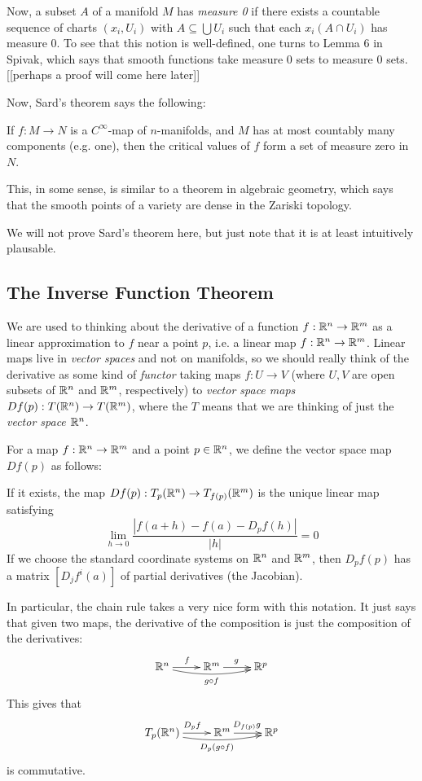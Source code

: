 \documentclass[11pt, english]{article}
\begin{document}
Now, a subset $A$  of a manifold $M$ has \emph{measure 0} if there exists a countable sequence of charts $(x_i, U_i)$  with $A \subseteq \bigcup U_i$ such that each $x_i(A \cap U_i)$ has measure $0$. To see that this notion is well-defined, one turns to Lemma 6 in Spivak, which says that smooth functions take measure 0 sets to measure 0 sets. [[perhaps a proof will come here later]]

Now, Sard's theorem says the following:
\begin{thm}
If $f:M \to N$ is a $C^\infty$-map of $n$-manifolds, and $M$ has at most countably many components (e.g. one), then the critical values of $f$ form a set of measure zero in $N$.
\end{thm}

This, in some sense, is similar to a theorem in algebraic geometry, which says that the smooth points of a variety are dense in the Zariski topology.

We will not prove Sard's theorem here, but just note that it is at least intuitively plausable.


\subsection{The Inverse Function Theorem}

We are used to thinking about the derivative of a function $f:\mathbb{R}^n \to \mathbb{R}^m$ as a linear approximation to $f$ near a point $p$, i.e. a linear map $f:\mathbb{R}^n \to \mathbb{R}^m$. Linear maps live in \emph{vector spaces} and not on manifolds, so we should really think of the derivative as some kind of \emph{functor} taking maps $f:U \to V$ (where $U,V$ are open subsets of $\mathbb{R}^n$ and $\mathbb{R}^m$, respectively) to \emph{vector space maps} $Df(p):T(\mathbb{R}^n) \to T(\mathbb{R}^m)$, where the $T$ means that we are thinking of just the \emph{vector space} $\mathbb{R}^n$.

For a map $f:\mathbb{R} ^n \to \mathbb{R}^m$ and a point $p \in \mathbb{R}^n$, we define the vector space map $Df(p)$ as follows:
\begin{defi}
If it exists, the map $Df(p):T_p(\mathbb{R}^n) \to T_{f(p)}(\mathbb{R}^m)$ is the unique linear map satisfying
\[
\lim_{h \to 0} \frac{|f(a+h)-f(a)-D_pf(h)|}{|h|} = 0
\]
If we choose the standard coordinate systems on $\mathbb{R}^n$ and $\mathbb{R}^m$, then $D_pf(p)$ has a matrix $\left[ D_j f^i (a) \right]$ of partial derivatives (the Jacobian).
\end{defi}

In particular, the chain rule takes a very nice form with this notation. It just says that given two maps, the derivative of the composition is just the composition of the derivatives:
\[
\xymatrix{
\R^n \ar[r]^f \ar@/_/[rr]_{g \circ f} & \R^m \ar[r]^g & \R^p
}
\]
This gives that
\[
\xymatrix{
T_p(\R^n) \ar[r]^{D_pf} \ar@/_/[rr]_{D_p(g \circ f)} & \R^m \ar[r]^{D_{f(p)}g} & \R^p
}
\]
is commutative.
\end{document}

